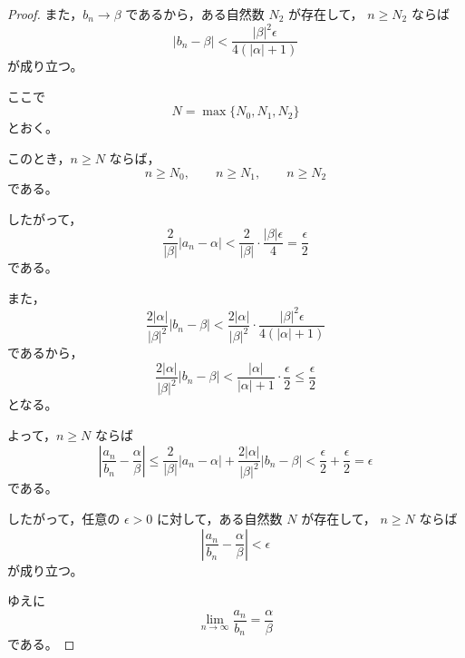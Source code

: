 \begin{proof}
    また，$b_n\to\beta$ であるから，ある自然数 $N_2$ が存在して，
    $n\geq N_2$ ならば
    \[
        |b_n-\beta|
        <
        \frac{|\beta|^2\epsilon}{4(|\alpha|+1)}
    \]
    が成り立つ。

    ここで
    \[
        N=\max\{N_0,N_1,N_2\}
    \]
    とおく。

    このとき，$n\geq N$ ならば，
    \[
        n\geq N_0,\qquad n\geq N_1,\qquad n\geq N_2
    \]
    である。

    したがって，
    \[
        \frac{2}{|\beta|}|a_n-\alpha|
        <
        \frac{2}{|\beta|}\cdot \frac{|\beta|\epsilon}{4}
        =
        \frac{\epsilon}{2}
    \]
    である。

    また，
    \[
        \frac{2|\alpha|}{|\beta|^2}|b_n-\beta|
        <
        \frac{2|\alpha|}{|\beta|^2}
        \cdot
        \frac{|\beta|^2\epsilon}{4(|\alpha|+1)}
    \]
    であるから，
    \[
        \frac{2|\alpha|}{|\beta|^2}|b_n-\beta|
        <
        \frac{|\alpha|}{|\alpha|+1}\cdot\frac{\epsilon}{2}
        \leq
        \frac{\epsilon}{2}
    \]
    となる。

    よって，$n\geq N$ ならば
    \[
        \left|
            \frac{a_n}{b_n}-\frac{\alpha}{\beta}
        \right|
        \leq
        \frac{2}{|\beta|}|a_n-\alpha|
        +
        \frac{2|\alpha|}{|\beta|^2}|b_n-\beta|
        <
        \frac{\epsilon}{2}+\frac{\epsilon}{2}
        =
        \epsilon
    \]
    である。

    したがって，任意の $\epsilon>0$ に対して，ある自然数 $N$ が存在して，
    $n\geq N$ ならば
    \[
        \left|
            \frac{a_n}{b_n}-\frac{\alpha}{\beta}
        \right|<\epsilon
    \]
    が成り立つ。

    ゆえに
    \[
        \lim_{n\to\infty}\frac{a_n}{b_n}
        =
        \frac{\alpha}{\beta}
    \]
    である。
\end{proof}